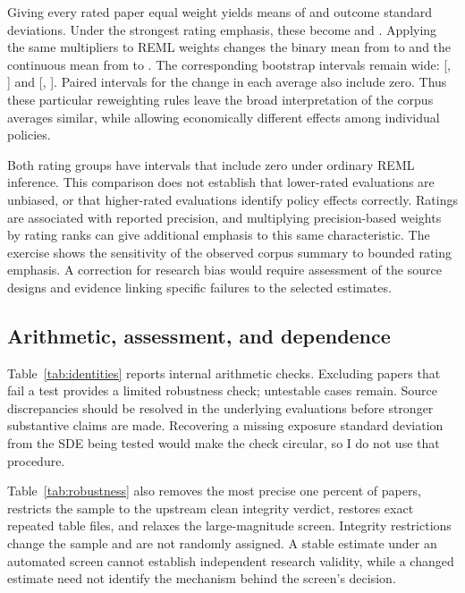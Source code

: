 \documentclass[11pt]{article}
\begin{document}
Giving every rated paper equal weight yields means of \BinaryRatingEqualBaseMean{} and \ContinuousRatingEqualBaseMean{} outcome standard deviations. Under the strongest rating emphasis, these become \BinaryRatingEqualRankMean{} and \ContinuousRatingEqualRankMean{}. Applying the same multipliers to REML weights changes the binary mean from \BinaryRatingREMLBaseMean{} to \BinaryRatingREMLRankMean{} and the continuous mean from \ContinuousRatingREMLBaseMean{} to \ContinuousRatingREMLRankMean{}. The corresponding bootstrap intervals remain wide: [\BinaryRatingREMLRankLo{}, \BinaryRatingREMLRankHi{}] and [\ContinuousRatingREMLRankLo{}, \ContinuousRatingREMLRankHi{}]. Paired intervals for the change in each average also include zero. Thus these particular reweighting rules leave the broad interpretation of the corpus averages similar, while allowing economically different effects among individual policies.

Both rating groups have intervals that include zero under ordinary REML inference. This comparison does not establish that lower-rated evaluations are unbiased, or that higher-rated evaluations identify policy effects correctly. Ratings are associated with reported precision, and multiplying precision-based weights by rating ranks can give additional emphasis to this same characteristic. The exercise shows the sensitivity of the observed corpus summary to bounded rating emphasis. A correction for research bias would require assessment of the source designs and evidence linking specific failures to the selected estimates.

\subsection{Arithmetic, assessment, and dependence}
Table~\ref{tab:identities} reports internal arithmetic checks. Excluding papers that fail a test provides a limited robustness check; untestable cases remain. Source discrepancies should be resolved in the underlying evaluations before stronger substantive claims are made. Recovering a missing exposure standard deviation from the SDE being tested would make the check circular, so I do not use that procedure.

Table~\ref{tab:robustness} also removes the most precise one percent of papers, restricts the sample to the upstream clean integrity verdict, restores exact repeated table files, and relaxes the large-magnitude screen. Integrity restrictions change the sample and are not randomly assigned. A stable estimate under an automated screen cannot establish independent research validity, while a changed estimate need not identify the mechanism behind the screen's decision.
\end{document}
